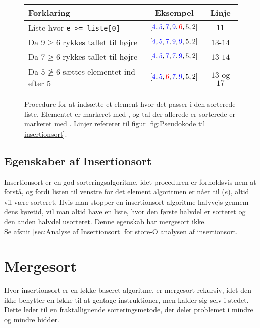 	\begin{figure}[h]
		\begin{center}
		\padtable
		\begin{tabular}{l|c|c}
			Forklaring & Eksempel & Linje\\
			\hline
			Liste hvor \verb|e >= liste[0]| & $[\color{blue}4\color{black},\color{blue}5\color{black},\color{blue}7\color{black},\color{blue}9\color{black},\color{red}6\color{black},5,2]$ &$11$\\
			Da $9 \geq 6$ rykkes tallet til højre & $[\color{blue}4\color{black},\color{blue}5\color{black},\color{blue}7\color{black},\color{blue}9\color{black},\color{blue}9\color{black},5,2]$ & $13$-$14$\\
			Da $7 \geq 6$ rykkes tallet til højre & $[\color{blue}4\color{black},\color{blue}5\color{black},\color{blue}7\color{black},\color{blue}7\color{black},\color{blue}9\color{black},5,2]$ & $13$-$14$\\
			Da $5 \ngeq 6$ sættes elementet ind efter $5$ & $[\color{blue}4\color{black},\color{blue}5\color{black},\color{red}6\color{black},\color{blue}7\color{black},\color{blue}9\color{black},5,2]$ & $13$ og $17$
		\end{tabular}
	\end{center}
	\vspace{-3mm}
	\caption{Procedure for at indsætte et element hvor det passer i den sorterede liste. Elementet er markeret med , og tal der allerede er sorterede er markeret med . Linjer refererer til figur \ref{fig:Pseudokode til insertionsort}.}
	\label{fig:Indsæt element hvor det passer i listen}
\end{figure}



\subsection{Egenskaber af Insertionsort}%
\label{sub:Egenskaber af Insertionsort}
Insertionsort er en god sorteringsalgoritme, idet proceduren er forholdsvis nem at forstå, og fordi listen til venstre for det element algoritmen er nået til ($e$), altid vil være sorteret. Hvis man stopper en insertionsort-algoritme halvvejs gennem dens køretid, vil man altid have en liste, hvor den første halvdel er sorteret og den anden halvdel usorteret. Denne egenskab har mergesort ikke.\\

Se afsnit \ref{sec:Analyse af Insertionsort} for store-O analysen af insertionsort.



\section{Mergesort}
\label{sec:Mergesort}

Hvor insertionsort er en løkke-baseret algoritme, er mergesort rekursiv, idet den ikke benytter en løkke til at gentage instruktioner, men kalder sig selv i stedet. Dette leder til en fraktallignende sorteringsmetode, der deler problemet i mindre og mindre bidder. 

